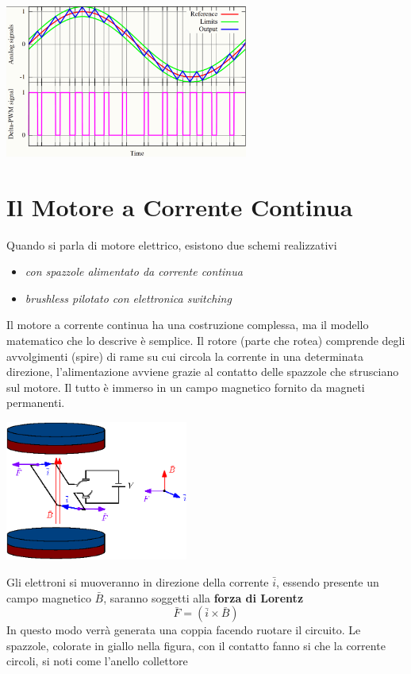 \documentclass[10pt, letterpaper]{report}
\begin{document}
\begin{center}
    \includegraphics[width=0.6\textwidth ]{images/DeltaPWM.png}
\end{center}
\flowerLine 
\section{Il Motore a Corrente Continua}
Quando si parla di motore elettrico, esistono due schemi realizzativi\begin{itemize}
    \item \textit{con spazzole alimentato da corrente continua} 
    \item \textit{brushless pilotato con elettronica switching}
\end{itemize}
Il motore a corrente continua ha una costruzione complessa, ma il modello matematico che lo descrive è semplice. Il rotore (parte che rotea) comprende degli avvolgimenti (spire) di rame su cui circola la corrente in una determinata direzione, l'alimentazione avviene grazie al contatto delle spazzole che strusciano sul motore. Il tutto è immerso in un campo magnetico fornito da magneti permanenti.\begin{center}
    \includegraphics[width=0.45\textwidth ]{images/motore2.eps}
\end{center}
Gli elettroni si muoveranno in direzione della corrente $\bar i$, essendo presente un campo magnetico $\bar B$, saranno soggetti alla \textbf{forza di Lorentz} 
$$ \bar F = (\bar i \times \bar B)$$
In questo modo verrà generata una coppia facendo ruotare il circuito. Le spazzole, colorate in giallo nella figura, con il contatto fanno si che la corrente circoli, si noti come l'anello collettore 
\end{document}
